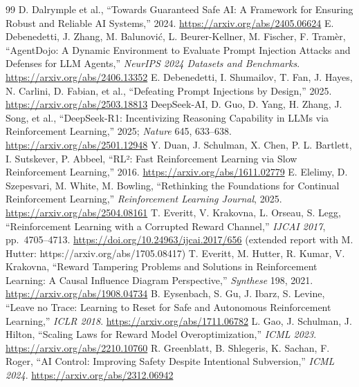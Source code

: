 \documentclass{article}
\begin{document}
\begin{thebibliography}{99}
 D. Dalrymple et al., ``Towards Guaranteed Safe AI: A Framework for Ensuring Robust and Reliable AI Systems,'' 2024. \url{https://arxiv.org/abs/2405.06624}
 E. Debenedetti, J. Zhang, M. Balunović, L. Beurer-Kellner, M. Fischer, F. Tramèr, ``AgentDojo: A Dynamic Environment to Evaluate Prompt Injection Attacks and Defenses for LLM Agents,'' \emph{NeurIPS 2024 Datasets and Benchmarks}. \url{https://arxiv.org/abs/2406.13352}
 E. Debenedetti, I. Shumailov, T. Fan, J. Hayes, N. Carlini, D. Fabian, et al., ``Defeating Prompt Injections by Design,'' 2025. \url{https://arxiv.org/abs/2503.18813}
 DeepSeek-AI, D. Guo, D. Yang, H. Zhang, J. Song, et al., ``DeepSeek-R1: Incentivizing Reasoning Capability in LLMs via Reinforcement Learning,'' 2025; \emph{Nature} 645, 633--638. \url{https://arxiv.org/abs/2501.12948}
 Y. Duan, J. Schulman, X. Chen, P. L. Bartlett, I. Sutskever, P. Abbeel, ``RL²: Fast Reinforcement Learning via Slow Reinforcement Learning,'' 2016. \url{https://arxiv.org/abs/1611.02779}
 E. Elelimy, D. Szepesvari, M. White, M. Bowling, ``Rethinking the Foundations for Continual Reinforcement Learning,'' \emph{Reinforcement Learning Journal}, 2025. \url{https://arxiv.org/abs/2504.08161}
 T. Everitt, V. Krakovna, L. Orseau, S. Legg, ``Reinforcement Learning with a Corrupted Reward Channel,'' \emph{IJCAI 2017}, pp.~4705--4713. \url{https://doi.org/10.24963/ijcai.2017/656} (extended report with M. Hutter: https://arxiv.org/abs/1705.08417)
 T. Everitt, M. Hutter, R. Kumar, V. Krakovna, ``Reward Tampering Problems and Solutions in Reinforcement Learning: A Causal Influence Diagram Perspective,'' \emph{Synthese} 198, 2021. \url{https://arxiv.org/abs/1908.04734}
 B. Eysenbach, S. Gu, J. Ibarz, S. Levine, ``Leave no Trace: Learning to Reset for Safe and Autonomous Reinforcement Learning,'' \emph{ICLR 2018}. \url{https://arxiv.org/abs/1711.06782}
 L. Gao, J. Schulman, J. Hilton, ``Scaling Laws for Reward Model Overoptimization,'' \emph{ICML 2023}. \url{https://arxiv.org/abs/2210.10760}
 R. Greenblatt, B. Shlegeris, K. Sachan, F. Roger, ``AI Control: Improving Safety Despite Intentional Subversion,'' \emph{ICML 2024}. \url{https://arxiv.org/abs/2312.06942}

\end{thebibliography}
\end{document}
